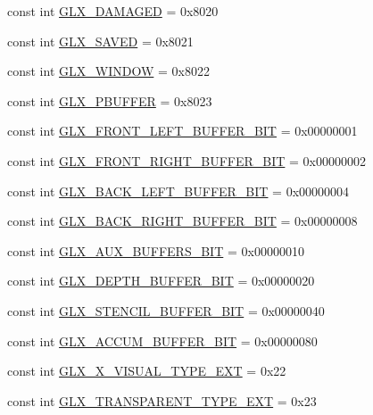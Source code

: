 \begin{DoxyCompactItemize}
\item 
const int \hyperlink{class_tao_1_1_platform_1_1_x11_1_1_glx_a3fa5e550a34663b1153f8fbd643366d1}{GLX\_\-DAMAGED} = 0x8020
\item 
const int \hyperlink{class_tao_1_1_platform_1_1_x11_1_1_glx_ae496c91203442a990a7c9d65e68d437a}{GLX\_\-SAVED} = 0x8021
\item 
const int \hyperlink{class_tao_1_1_platform_1_1_x11_1_1_glx_a6f88ad44e0889a5ad2156f84a70bb493}{GLX\_\-WINDOW} = 0x8022
\item 
const int \hyperlink{class_tao_1_1_platform_1_1_x11_1_1_glx_a2fc2a28bd00b531b96e0041cbdeef3c3}{GLX\_\-PBUFFER} = 0x8023
\item 
const int \hyperlink{class_tao_1_1_platform_1_1_x11_1_1_glx_ab5e6633688255a2b3c1c2936c49b163e}{GLX\_\-FRONT\_\-LEFT\_\-BUFFER\_\-BIT} = 0x00000001
\item 
const int \hyperlink{class_tao_1_1_platform_1_1_x11_1_1_glx_adc5d0545c96bfb8b1bdd0de0ef29cb0e}{GLX\_\-FRONT\_\-RIGHT\_\-BUFFER\_\-BIT} = 0x00000002
\item 
const int \hyperlink{class_tao_1_1_platform_1_1_x11_1_1_glx_a40dba5844dd72194aed1435029abd44d}{GLX\_\-BACK\_\-LEFT\_\-BUFFER\_\-BIT} = 0x00000004
\item 
const int \hyperlink{class_tao_1_1_platform_1_1_x11_1_1_glx_ae28309df04eee65baa036636d1e59459}{GLX\_\-BACK\_\-RIGHT\_\-BUFFER\_\-BIT} = 0x00000008
\item 
const int \hyperlink{class_tao_1_1_platform_1_1_x11_1_1_glx_a05b8a5094b02f9360c52f2aec0437d2d}{GLX\_\-AUX\_\-BUFFERS\_\-BIT} = 0x00000010
\item 
const int \hyperlink{class_tao_1_1_platform_1_1_x11_1_1_glx_a2edb4c4f6cb3c8aaecba060d252374bb}{GLX\_\-DEPTH\_\-BUFFER\_\-BIT} = 0x00000020
\item 
const int \hyperlink{class_tao_1_1_platform_1_1_x11_1_1_glx_abe1d839f1268a0a69d7754360a86a539}{GLX\_\-STENCIL\_\-BUFFER\_\-BIT} = 0x00000040
\item 
const int \hyperlink{class_tao_1_1_platform_1_1_x11_1_1_glx_a8522671492da2b591a4b4c8733dfbc97}{GLX\_\-ACCUM\_\-BUFFER\_\-BIT} = 0x00000080
\item 
const int \hyperlink{class_tao_1_1_platform_1_1_x11_1_1_glx_a2daf7c1f9d1e7abca98e0365a6d6adc5}{GLX\_\-X\_\-VISUAL\_\-TYPE\_\-EXT} = 0x22
\item 
const int \hyperlink{class_tao_1_1_platform_1_1_x11_1_1_glx_a593a81b432a1d5ec6e300ad2f57438e3}{GLX\_\-TRANSPARENT\_\-TYPE\_\-EXT} = 0x23
\item 

\end{DoxyCompactItemize}
